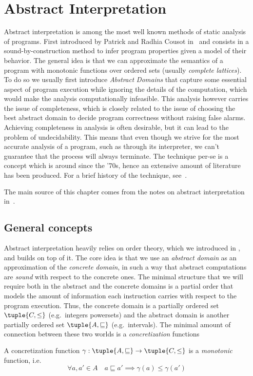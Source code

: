 \section{Abstract Interpretation}\label{sec:abstrint}

Abstract interpretation is among the most well known methods of static
analysis of programs. First introduced by Patrick and Radhia Cousot
in~\cite{patrickradhia:one, patrickradhia:two} and consists in a
sound-by-construction method to infer program properties given a model
of their behavior. The general idea is that we can approximate the
semantics of a program with monotonic functions over ordered sets
(usually \emph{complete lattices}). To do so we usually first
introduce \emph{Abstract Domains} that capture some essential aspect
of program execution while ignoring the details of the computation,
which would make the analysis computationally infeasible.  This
analysis however carries the issue of completeness, which is closely
related to the issue of choosing the best abstract domain to decide
program correctness without raising false alarms. Achieving
completeness in analysis is often desirable, but it can lead to the
problem of undecidability. This means that even though we strive for
the most accurate analysis of a program, such as through its
interpreter, we can't guarantee that the process will always
terminate.  The technique per-se is a concept which is around since
the '70s, hence an extensive amount of literature has been
produced. For a brief history of the technique,
see~\cite{ranzato:history}.

The main source of this chapter comes from the notes on abstract
interpretation in~\cite{mine:course}.

\subsection{General concepts}\label{subsec:abstrgeneral}

Abstract interpretation heavily relies on order theory, which we
introduced in , and builds on top of
it. The core idea is that we use an \emph{abstract domain} as an
approximation of the \emph{concrete domain}, in such a way that
abstract computations are \emph{sound} with respect to the concrete
ones. The minimal structure that we will require both in the abstract
and the concrete domains is a partial order that models the amount of
information each instruction carries with respect to the program
execution. Thus, the concrete domain is a partially ordered set
\(\tuple{C, \leq}\) (e.g.\ integers powersets) and the abstract domain
is another partially ordered set \(\tuple{A, \sqsubseteq}\) (e.g.\
intervals). The minimal amount of connection between these two worlds
is a \emph{concretization} functions
\begin{definition}[Concretization]
  A concretization function
  \(\gamma : \tuple{A , \sqsubseteq} \to \tuple{C, \leq}\) is a
  \emph{monotonic} function, i.e.
  \begin{equation*}
    \forall a,a' \in A \quad a \sqsubseteq a' \implies \gamma(a) \leq \gamma(a')
  \end{equation*}
\end{definition}

